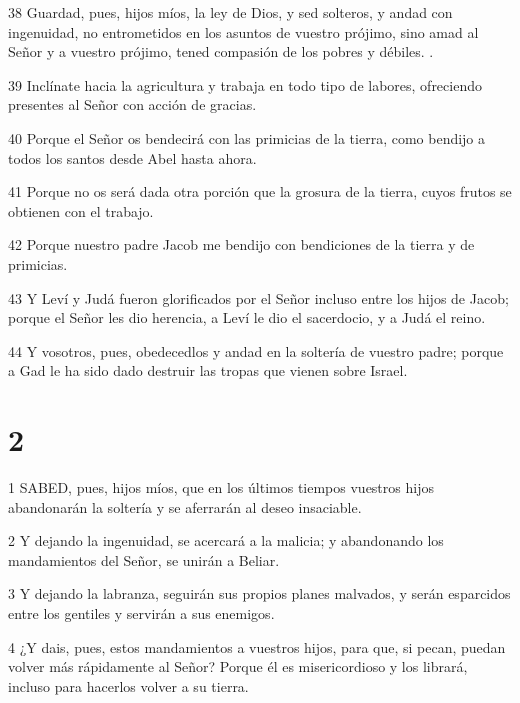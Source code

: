 \par 38 Guardad, pues, hijos míos, la ley de Dios, y sed solteros, y andad con ingenuidad, no entrometidos en los asuntos de vuestro prójimo, sino amad al Señor y a vuestro prójimo, tened compasión de los pobres y débiles. .

\par 39 Inclínate hacia la agricultura y trabaja en todo tipo de labores, ofreciendo presentes al Señor con acción de gracias.

\par 40 Porque el Señor os bendecirá con las primicias de la tierra, como bendijo a todos los santos desde Abel hasta ahora.

\par 41 Porque no os será dada otra porción que la grosura de la tierra, cuyos frutos se obtienen con el trabajo.

\par 42 Porque nuestro padre Jacob me bendijo con bendiciones de la tierra y de primicias.

\par 43 Y Leví y Judá fueron glorificados por el Señor incluso entre los hijos de Jacob; porque el Señor les dio herencia, a Leví le dio el sacerdocio, y a Judá el reino.

\par 44 Y vosotros, pues, obedecedlos y andad en la soltería de vuestro padre; porque a Gad le ha sido dado destruir las tropas que vienen sobre Israel.

\chapter{2}

\par 1 SABED, pues, hijos míos, que en los últimos tiempos vuestros hijos abandonarán la soltería y se aferrarán al deseo insaciable.

\par 2 Y dejando la ingenuidad, se acercará a la malicia; y abandonando los mandamientos del Señor, se unirán a Beliar.

\par 3 Y dejando la labranza, seguirán sus propios planes malvados, y serán esparcidos entre los gentiles y servirán a sus enemigos.

\par 4 ¿Y dais, pues, estos mandamientos a vuestros hijos, para que, si pecan, puedan volver más rápidamente al Señor? Porque él es misericordioso y los librará, incluso para hacerlos volver a su tierra.

